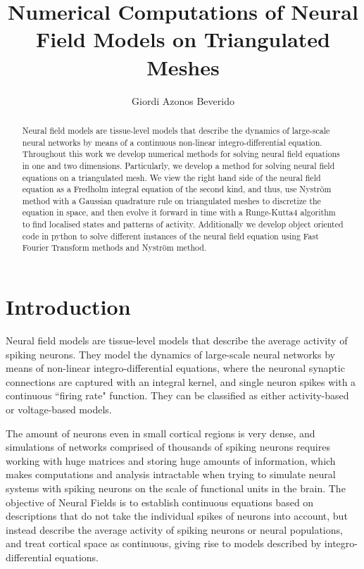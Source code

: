 \documentclass{uonmathreport}
\title{Numerical Computations of Neural Field Models on Triangulated Meshes}
\author{Giordi Azonos Beverido}
\begin{document}
\maketitle

\begin{abstract}
Neural field models are tissue-level models that describe the dynamics of large-scale neural networks by means of a continuous non-linear integro-differential equation. Throughout this work we develop numerical methods for solving neural field equations in one and two dimensions. Particularly, we develop a method for solving neural field equations on a triangulated mesh. We view the right hand side of the neural field equation as a Fredholm integral equation of the second kind, and thus, use Nystr\"om method with a Gaussian quadrature rule on triangulated meshes to discretize the equation in space, and then evolve it forward in time with a Runge-Kutta4 algorithm to find localised states and patterns of activity. Additionally we develop object oriented code in python to solve different instances of the neural field equation using Fast Fourier Transform methods and Nystr\"om method.
\end{abstract}

\setcounter{tocdepth}{2}  %
\tableofcontents 

\newpage
\section{Introduction} \label{sec:intro}

Neural field models are tissue-level models that describe the average activity of spiking neurons. They model the dynamics of large-scale neural networks by means of non-linear integro-differential equations, where the neuronal synaptic connections are captured with an integral kernel, and single neuron spikes with a continuous ``firing rate" function. 
They can be classified as either activity-based or voltage-based models.

The amount of neurons even in small cortical regions is very dense, and simulations of networks comprised of thousands of spiking neurons requires working with huge matrices and storing huge amounts of information, which makes computations and analysis intractable when trying to simulate neural systems with spiking neurons on the scale of functional units in the brain. The objective of Neural Fields is to establish continuous equations based on descriptions that do not take the individual spikes of neurons into account, but instead describe the average activity of spiking neurons or neural populations, and treat cortical space as continuous, giving rise to models described by integro-differential equations.
\end{document}
